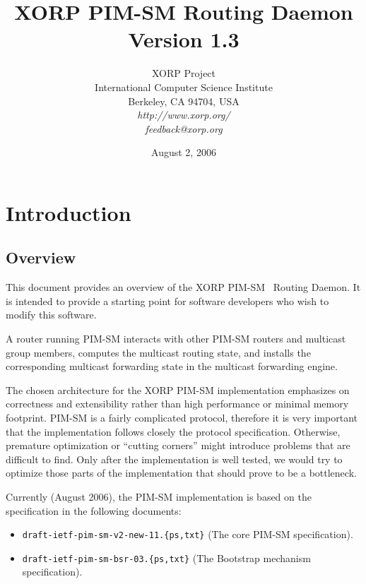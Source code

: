 \documentclass[11pt]{article}
\begin{document}
\title{XORP PIM-SM Routing Daemon \\
\vspace{1ex}
Version 1.3}
\author{ XORP Project					\\
	 International Computer Science Institute	\\
	 Berkeley, CA 94704, USA			\\
         {\it http://www.xorp.org/}			\\
	 {\it feedback@xorp.org}
}
\date{August 2, 2006}

\maketitle


\section{Introduction}


\subsection{Overview}

This document provides an overview of the XORP PIM-SM~\cite{PIM-SM}
Routing Daemon. It is intended to provide a starting point for software
developers who wish to modify this software.

A router running PIM-SM interacts with other PIM-SM routers and
multicast group members, computes the multicast routing state, and installs
the corresponding multicast forwarding state in the multicast forwarding
engine.

The chosen architecture for the XORP PIM-SM implementation emphasizes on
correctness and extensibility rather than high performance or minimal
memory footprint. PIM-SM is a fairly complicated protocol, therefore it
is very important that the implementation follows closely the protocol
specification. Otherwise, premature optimization or ``cutting corners''
might introduce problems that are difficult to find. Only after the
implementation is well tested, we would
try to optimize those parts of the implementation that should prove
to be a bottleneck.

Currently (August 2006), the PIM-SM implementation is based
on the specification in the following documents:

\begin{itemize}
  \item \verb=draft-ietf-pim-sm-v2-new-11.{ps,txt}= (The core PIM-SM
  specification).
  \item \verb=draft-ietf-pim-sm-bsr-03.{ps,txt}= (The Bootstrap mechanism
  specification).
\end{itemize}
\end{document}
